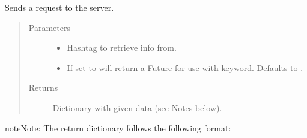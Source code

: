 \documentclass[letterpaper,10pt,english,openany,oneside]{sphinxmanual}
\begin{document}
\begin{fulllineitems}
\label{\detokenize{source/api:instahashtag.api.tag}}
Sends a request to the server.
\begin{quote}\begin{description}
\item[{Parameters}] \leavevmode\begin{itemize}
\item {} 
 \textendash{} Hashtag to retrieve info from.

\item {} 
 \textendash{} If set to  will return a Future for use with  keyword. Defaults to .

\end{itemize}

\item[{Returns}] \leavevmode
Dictionary with given data (see Notes below).

\end{description}\end{quote}

\begin{sphinxadmonition}{note}{Note:}
The return dictionary follows the following format:

\begin{sphinxVerbatim}[commandchars=\\\{\}]
     \PYG{p}{[} \PYG{p}{]}
     
     \PYG{p}{[}
             
             \PYG{p}{[} \PYG{p}{]}
             
             
             
             
    \PYG{p}{]}
     
     
\end{sphinxVerbatim}
\end{sphinxadmonition}

\end{fulllineitems}
\end{document}
